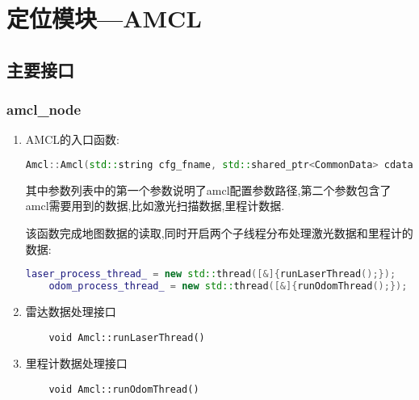 




\chapter{定位模块---AMCL}
\section{主要接口}

\subsection{amcl\_node}

\begin{enumerate}
  \item AMCL的入口函数:
  \begin{lstlisting}[language={c++}]
    Amcl::Amcl(std::string cfg_fname, std::shared_ptr<CommonData> cdata) 
  \end{lstlisting}
  
  其中参数列表中的第一个参数说明了amcl配置参数路径,第二个参数包含了amcl需要用到的数据,比如激光扫描数据,里程计数据.

  该函数完成地图数据的读取,同时开启两个子线程分布处理激光数据和里程计的数据:

  \begin{lstlisting}[language={c++}]
    laser_process_thread_ = new std::thread([&]{runLaserThread();}); 
    odom_process_thread_ = new std::thread([&]{runOdomThread();});
  \end{lstlisting}

  \item 雷达数据处理接口
  \begin{lstlisting}
    void Amcl::runLaserThread()
  \end{lstlisting}
  
  \item 里程计数据处理接口
  \begin{lstlisting}
    void Amcl::runOdomThread()
  \end{lstlisting}
  
\end{enumerate}

